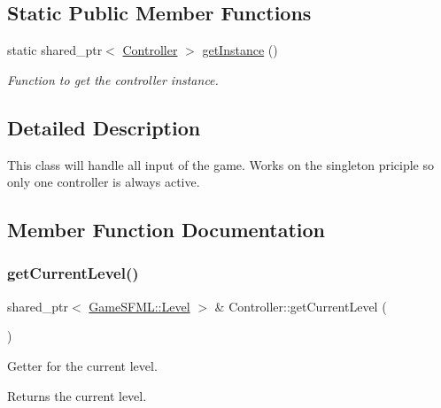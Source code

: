 \subsection*{Static Public Member Functions}
\begin{DoxyCompactItemize}
\item 
static shared\+\_\+ptr$<$ \hyperlink{classController}{Controller} $>$ \hyperlink{classController_a155147647e348dc4c805977e93889512}{get\+Instance} ()
\begin{DoxyCompactList}\small\item\em Function to get the controller instance. \end{DoxyCompactList}\end{DoxyCompactItemize}


\subsection{Detailed Description}
This class will handle all input of the game. Works on the singleton priciple so only one controller is always active. 

\subsection{Member Function Documentation}
\mbox{\label{classController_ad4126984329d864fcd63b10103c6e138}} 
\subsubsection{\texorpdfstring{get\+Current\+Level()}{getCurrentLevel()}}
{\footnotesize\ttfamily shared\+\_\+ptr$<$ \hyperlink{classGameSFML_1_1Level}{Game\+S\+F\+M\+L\+::\+Level} $>$ \& Controller\+::get\+Current\+Level (\begin{DoxyParamCaption}{ }\end{DoxyParamCaption})}

Getter for the current level. \begin{DoxyReturn}{Returns}
the current level. 
\end{DoxyReturn}
\mbox{\label{classController_a155147647e348dc4c805977e93889512}} 

